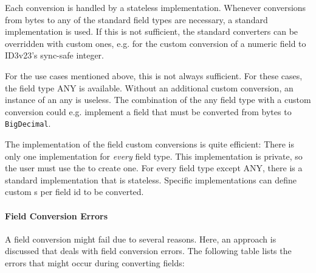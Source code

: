 Each conversion is handled by a stateless \IFfieldConverter{} implementation. Whenever conversions from bytes to any of the standard field types are necessary, a standard \IFfieldConverter{} implementation is used. If this is not sufficient, the standard converters can be overridden with custom ones, e.g. for the custom conversion of a numeric field to ID3v23's sync-safe integer.

For the use cases mentioned above, this is not always sufficient. For these cases, the field type ANY is available. Without an additional custom conversion, an instance of an any \IFfield{} is useless. The combination of the any field type with a custom conversion could e.g. implement a field that must be converted from bytes to \texttt{BigDecimal}.

The implementation of the field custom conversions is quite efficient: There is only one \IFField{} implementation for \emph{every} field type. This implementation is private, so the \LibName{} user must use the \IFdataBlockFactory{} to create one. For every field type except ANY, there is a standard \IFfieldConverter{} implementation that is stateless. Specific \IFdataBlockFactory{} implementations can define custom \IFfieldConverter{}s per field id to be converted.


\paragraph{Field Conversion Errors}
\label{sec:FieldConversionErrors}

A field conversion might fail due to several reasons. Here, an approach is discussed that deals with field conversion errors. The following table lists the errors that might occur during converting fields:

